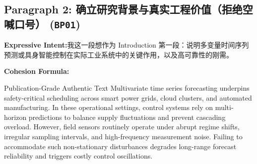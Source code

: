 \subsection*{Paragraph 2: 确立研究背景与真实工程价值（拒绝空喊口号） (\texttt{BP01})}
\noindent\textbf{Expressive Intent:}\enspace 我这一段想作为 Introduction 第一段：说明多变量时间序列预测或具身智能控制在实际工业系统中的关键作用，以及高可靠性的刚需。\par
\noindent\textbf{Cohesion Formula:}\par\vspace{4pt}
\begin{ExampleBox}{Publication-Grade Authentic Text}
Multivariate time series forecasting underpins safety-critical scheduling across smart power grids, cloud clusters, and automated manufacturing. In these operational settings, control systems rely on multi-horizon predictions to balance supply fluctuations and prevent cascading overload. However, field sensors routinely operate under abrupt regime shifts, irregular sampling intervals, and high-frequency measurement noise. Failing to accommodate such non-stationary disturbances degrades long-range forecast reliability and triggers costly control oscillations.
\end{ExampleBox}
